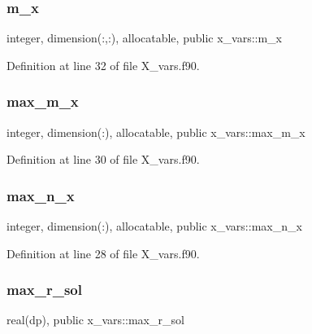 \subsubsection{\texorpdfstring{m\+\_\+x}{m\_x}}
{\footnotesize\ttfamily integer, dimension(\+:,\+:), allocatable, public x\+\_\+vars\+::m\+\_\+x}



Definition at line 32 of file X\+\_\+vars.\+f90.

\mbox{\label{namespacex__vars_aad66540f255243f66887442b9ef3c745}} 
\subsubsection{\texorpdfstring{max\+\_\+m\+\_\+x}{max\_m\_x}}
{\footnotesize\ttfamily integer, dimension(\+:), allocatable, public x\+\_\+vars\+::max\+\_\+m\+\_\+x}



Definition at line 30 of file X\+\_\+vars.\+f90.

\mbox{\label{namespacex__vars_a2f04400f8c1489db3f2d66fa972852a5}} 
\subsubsection{\texorpdfstring{max\+\_\+n\+\_\+x}{max\_n\_x}}
{\footnotesize\ttfamily integer, dimension(\+:), allocatable, public x\+\_\+vars\+::max\+\_\+n\+\_\+x}



Definition at line 28 of file X\+\_\+vars.\+f90.

\mbox{\label{namespacex__vars_a0f45dfddb928623424eeb8b8bdd2b0f9}} 
\subsubsection{\texorpdfstring{max\+\_\+r\+\_\+sol}{max\_r\_sol}}
{\footnotesize\ttfamily real(dp), public x\+\_\+vars\+::max\+\_\+r\+\_\+sol}



